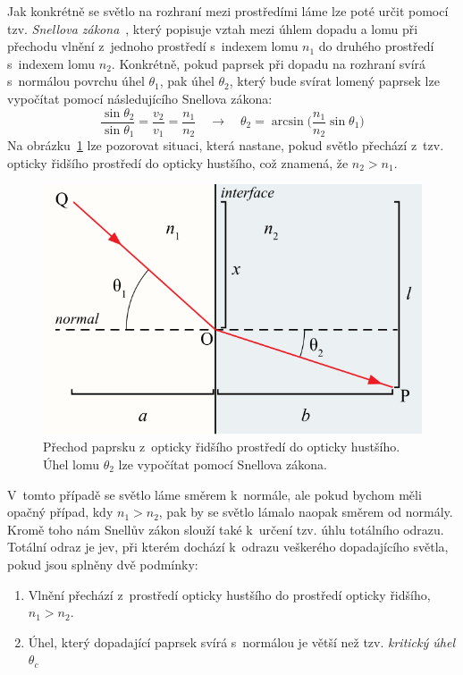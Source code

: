 Jak konkrétně se světlo na rozhraní mezi prostředími
láme lze poté určit pomocí tzv. 
\textit{Snellova zákona}~\cite{wiki_snells_law}, 
který popisuje vztah mezi
úhlem dopadu a lomu při přechodu vlnění z~jednoho
prostředí s~indexem lomu $n_1$ do druhého prostředí
s~indexem lomu $n_2$. Konkrétně, pokud paprsek při
dopadu na rozhraní svírá s~normálou povrchu úhel
$\theta_1$, pak úhel $\theta_2$, který bude svírat
lomený paprsek lze vypočítat pomocí následujícího
Snellova zákona:
$$
\frac{\sin\theta_2}{\sin\theta_1} = \frac{v_2}{v_1}
= \frac{n_1}{n_2}
\quad\longrightarrow\quad
\theta_2 = \arcsin\Big(\frac{n_1}{n_2}\sin\theta_1\Big)
$$
Na obrázku~\ref{fig:snell_law} lze pozorovat situaci,
která nastane, pokud světlo přechází z~tzv. opticky
řidšího prostředí do opticky hustšího, což znamená,
že $n_2 > n_1$.
\begin{figure}[htbp]
    \centering
    \includegraphics[scale=0.37]{img/snells_law.png}
    \caption{Přechod paprsku z~opticky řidšího
    prostředí do opticky hustšího. Úhel lomu
    $\theta_2$ lze vypočítat pomocí Snellova zákona.}
    \label{fig:snell_law}
\end{figure}
V~tomto případě se světlo láme směrem k~normále,
ale pokud bychom měli opačný případ, kdy $n_1 > n_2$,
pak by se světlo lámalo naopak směrem od normály.
Kromě toho nám Snellův zákon slouží také k~určení
tzv. úhlu totálního odrazu. Totální odraz je jev,
při kterém dochází k~odrazu veškerého dopadajícího
světla, pokud jsou splněny dvě podmínky:
\begin{enumerate}
    \item Vlnění přechází z~prostředí opticky
    hustšího do prostředí opticky řidšího,
    $n_1 > n_2$.
    
    \item Úhel, který dopadající paprsek svírá
    s~normálou je větší než tzv. \textit{kritický
    úhel} $\theta_c$
\end{enumerate}
